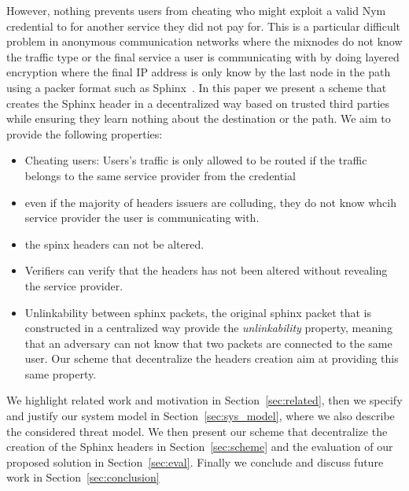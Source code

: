 However, nothing prevents users from cheating who might exploit a valid Nym credential to for another service they did not pay for. This is a particular difficult problem in anonymous communication networks where the mixnodes do not know the traffic type or the final service a user is communicating with by doing layered encryption where the final IP address is only know by the last node in the path using a packer format such as Sphinx~\cite{sphinx}. 
\newline
In this paper we present a scheme that creates the Sphinx header in a decentralized way based on trusted third parties while ensuring they learn nothing about the destination or the path. We aim to provide the following properties:
\begin{itemize}
	\item Cheating users: Users's traffic is only allowed to be routed if the traffic belongs to the same service provider from the credential
	\item even if the majority of headers issuers are colluding, they do not know whcih service provider the user is communicating with.
	\item the spinx headers can not be altered.
	\item Verifiers can verify that the headers has not been altered without revealing the service provider.
	\item Unlinkability between  sphinx packets, the original sphinx packet that is constructed in a centralized way provide the \textit{unlinkability} property, meaning that an adversary can not know that two packets are connected to the same user. Our scheme that decentralize the headers creation aim at providing this same property.
\end{itemize}
We highlight related work and motivation in Section~\ref{sec:related}, then we specify and justify our system model in Section~\ref{sec:sys_model}, where we also describe the considered threat model. We then present our scheme that decentralize the creation of the Sphinx headers in Section~\ref{sec:scheme} and the evaluation of our proposed solution in Section~\ref{sec:eval}. Finally we conclude and discuss future work in Section~\ref{sec:conclusion}